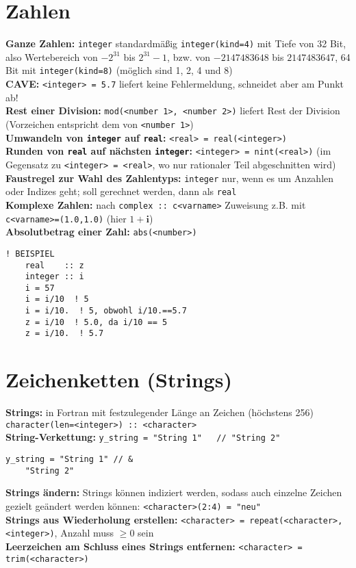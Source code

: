 \documentclass[a4paper, twocolumn]{scrarticle}
\begin{document}
  \section{Zahlen}
  \textbf{Ganze Zahlen:} \lstinline|integer| standardmäßig \lstinline|integer(kind=4)| mit Tiefe von 32 Bit, also Wertebereich von $-2^{31}$ bis $2^{31}-1$, bzw. von $-2147483648$ bis $2147483647$, 64 Bit mit \lstinline|integer(kind=8)| (möglich sind 1, 2, 4 und 8)\\
  \textbf{CAVE:} \lstinline|<integer> = 5.7| liefert keine Fehlermeldung, schneidet aber am Punkt ab!\\
  \textbf{Rest einer Division:} \lstinline|mod(<number 1>, <number 2>)| liefert Rest der Division (Vorzeichen entspricht dem von \lstinline|<number 1>|) \\
  \textbf{Umwandeln von \lstinline|integer| auf \lstinline|real|:} \lstinline|<real> = real(<integer>)|\\
  \textbf{Runden von \lstinline|real| auf nächsten \lstinline|integer|:} \lstinline|<integer> = nint(<real>)| (im Gegensatz zu \lstinline|<integer> = <real>|, wo nur rationaler Teil abgeschnitten wird)\\
  \textbf{Faustregel zur Wahl des Zahlentyps:} \lstinline|integer| nur, wenn es um Anzahlen oder Indizes geht; soll gerechnet werden, dann als \lstinline|real|\\
    \textbf{Komplexe Zahlen:} nach \lstinline|complex :: c<varname>| Zuweisung z.B. mit \lstinline|c<varname>=(1.0,1.0)| (hier $1+\textbf{i}$)\\
  \textbf{Absolutbetrag einer Zahl:} \lstinline|abs(<number>)|
  \begin{lstlisting}[caption={\bfseries Beispiel: CAVE - implizite Umwandlungen bei Division}]
    ! BEISPIEL
    real    :: z
    integer :: i
    i = 57
    i = i/10  ! 5
    i = i/10.  ! 5, obwohl i/10.==5.7
    z = i/10  ! 5.0, da i/10 == 5
    z = i/10.  ! 5.7
  \end{lstlisting}
  
  \section{Zeichenketten (\glqq Strings\grqq)}
  \textbf{Strings:} in Fortran mit festzulegender Länge an Zeichen  (höchstens 256) \lstinline|character(len=<integer>) :: <character>|\\
  \textbf{String-Verkettung:} \lstinline|y_string = "String 1"   // "String 2"|
  \begin{lstlisting}[caption={\bfseries Beispiel: String-Verkettung über Code-Zeilen hinweg},label=lst:stringkette]
    y_string = "String 1" // &
    "String 2"
  \end{lstlisting}
  \textbf{Strings ändern:} Strings können indiziert werden, sodass auch einzelne Zeichen gezielt geändert werden können: \lstinline|<character>(2:4) = "neu"|\\
  \textbf{Strings aus Wiederholung erstellen:} \lstinline|<character> = repeat(<character>, <integer>)|, Anzahl muss $\geq 0$ sein\\
  \textbf{Leerzeichen am Schluss eines Strings entfernen:} \lstinline|<character> = trim(<character>)|
  
\end{document}
